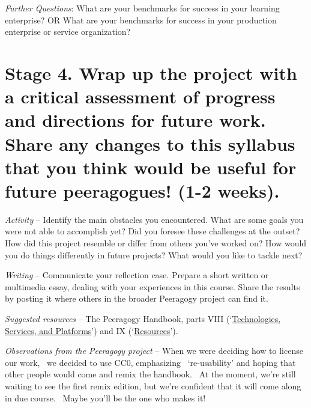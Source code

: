 \emph{Further Questions}: What are your benchmarks for success
in your learning enterprise? OR What are your benchmarks for
success in your production enterprise or service organization?


\section*{Stage 4. Wrap up the project with a critical assessment of
progress and directions for future work. Share any changes to this
syllabus that you think would be useful for future peeragogues! (1-2
weeks).}\label{stage-4.-wrap-up-the-project-with-a-critical-assessment-of-progress-and-directions-for-future-work.-share-any-changes-to-this-syllabus-that-you-think-would-be-useful-for-future-peeragogues-1-2-weeks.}

\emph{Activity} -- Identify the main obstacles you encountered. What are
some goals you were not able to accomplish yet? Did you foresee these
challenges at the outset? How did this project resemble or differ from
others you've worked on? How would you do things differently in future
projects? What would you like to tackle next?

\emph{Writing} -- Communicate your reflection case. Prepare a short
written or multimedia essay, dealing with your experiences in this
course. Share the results by posting it where others in the broader
Peeragogy project can find it.

\emph{Suggested resources} -- The Peeragogy Handbook, parts VIII
(`\href{http://peeragogy.org/resources/technologies/}{Technologies,
Services, and Platforms}') and IX
(`\href{http://peeragogy.org/resources/}{Resources}').

\emph{Observations from the Peeragogy project} -- When we were deciding
how to license our work,~ we decided to use CC0, emphasizing~
`re-usability' and hoping that other people would come and remix the
handbook.~ At the moment, we're still waiting to see the first remix
edition, but we're confident that it will come along in due course.~
Maybe you'll be the one who makes it!

